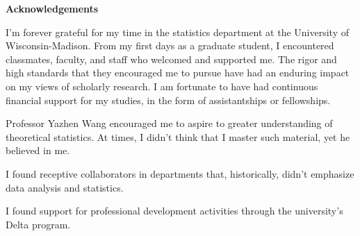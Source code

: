 \newenvironment{acknowledgements}%
    {\cleardoublepage\null\vfill\begin{center}%
    \bfseries Acknowledgements\end{center}}%
    {\vfill\null}
        \begin{acknowledgements}
I'm forever grateful for my time in the statistics department at the University of Wisconsin-Madison. From my first days as a graduate student, I encountered classmates, faculty, and staff who welcomed and supported me. The rigor and high standards that they encouraged me to pursue have had an enduring impact on my views of scholarly research. I am fortunate to have had continuous financial support for my studies, in the form of assistantships or fellowships. 

Professor Yazhen Wang encouraged me to aspire to greater understanding of theoretical statistics. At times, I didn't think that I master such material, yet he believed in me. 

I found receptive collaborators in departments that, historically, didn't emphasize data analysis and statistics. 




I found support for professional development activities through the university's Delta program.



\end{acknowledgements}